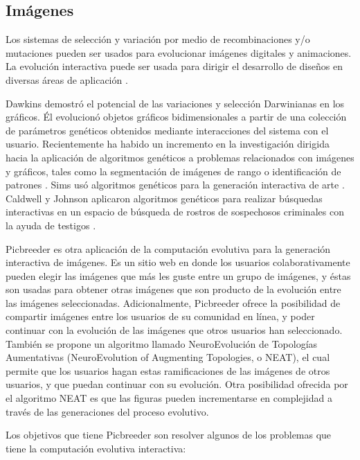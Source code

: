 \subsection{Imágenes}

Los sistemas de selección y variación por medio de recombinaciones y/o mutaciones pueden ser usados para evolucionar imágenes digitales y animaciones. La evolución interactiva puede ser usada para dirigir el desarrollo de diseños en diversas áreas de aplicación \cite{graf1995interactive}.

Dawkins \cite{dawkins1988blind} demostró el potencial de las variaciones y selección Darwinianas en los gráficos. Él evolucionó objetos gráficos bidimensionales a partir de una colección de parámetros genéticos obtenidos mediante interacciones del sistema con el usuario. Recientemente ha habido un incremento en la investigación dirigida hacia la aplicación de algoritmos genéticos a problemas relacionados con imágenes y gráficos, tales como la segmentación de imágenes de rango \cite{meygret1992robust} o identificación de patrones \cite{hill1992object}. Sims usó algoritmos genéticos para la generación interactiva de arte \cite{sims1991artificial}. Caldwell y Johnson aplicaron algoritmos genéticos para realizar búsquedas interactivas en un espacio de búsqueda de rostros de sospechosos criminales con la ayuda de testigos \cite{caldwell1991tracking}.

Picbreeder \cite{secretan2008picbreeder} es otra aplicación de la computación evolutiva para la generación interactiva de imágenes. Es un sitio web en donde los usuarios colaborativamente pueden elegir las imágenes que más les guste entre un grupo de imágenes, y éstas son usadas para obtener otras imágenes que son producto de la evolución entre las imágenes seleccionadas. Adicionalmente, Picbreeder ofrece la posibilidad de compartir imágenes entre los usuarios de su comunidad en línea, y poder continuar con la evolución de las imágenes que otros usuarios han seleccionado. También se propone un algoritmo llamado NeuroEvolución de Topologías Aumentativas (NeuroEvolution of Augmenting Topologies, o NEAT), el cual permite que los usuarios hagan estas ramificaciones de las imágenes de otros usuarios, y que puedan continuar con su evolución. Otra posibilidad ofrecida por el algoritmo NEAT es que las figuras pueden incrementarse en complejidad a través de las generaciones del proceso evolutivo.

Los objetivos que tiene Picbreeder son resolver algunos de los problemas que tiene la computación evolutiva interactiva:

